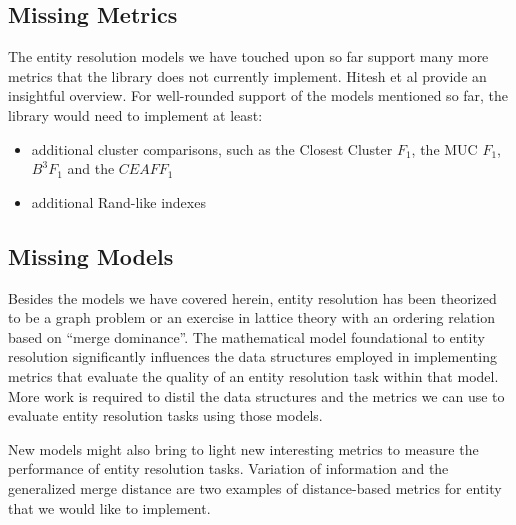 \documentclass[a4paper,twoside]{article}
\begin{document}
    \subsection{Missing Metrics}

    The entity resolution models we have touched upon so far support many more
    metrics that the library does not currently implement.
    Hitesh et al provide an insightful overview\cite{hitesh2012}.
    For well-rounded support of the models mentioned so far, the library would
    need to implement at least:
    \begin{itemize}
        \item additional cluster comparisons, such as the Closest Cluster $F_1$, the
        MUC $F_1$, $B^3 F_1$ and the $CEAF F_1$\cite{hitesh2012}
        \item additional Rand-like indexes\cite{warrens2022understanding}
    \end{itemize}

    \subsection{Missing Models}

    Besides the models we have covered herein, entity resolution has been
    theorized to be a graph problem\cite{eager2021} or an exercise in lattice
    theory with an ordering relation based on
    ``merge dominance''\cite{Ben2009Swoosh}.
    The mathematical model foundational to entity resolution significantly
    influences the data structures employed in implementing metrics that
    evaluate the quality of an entity resolution task within that model.
    More work is required to distil the data structures and the metrics we can
    use to evaluate entity resolution tasks using those models.

    New models might also bring to light new interesting metrics to
    measure the performance of entity resolution tasks.
    Variation of information\cite{meila2007vi} and the generalized merge
    distance\cite{Men10} are two examples of distance-based metrics for entity
    that we would like to implement.

    
    {\small
    
    }
\end{document}
